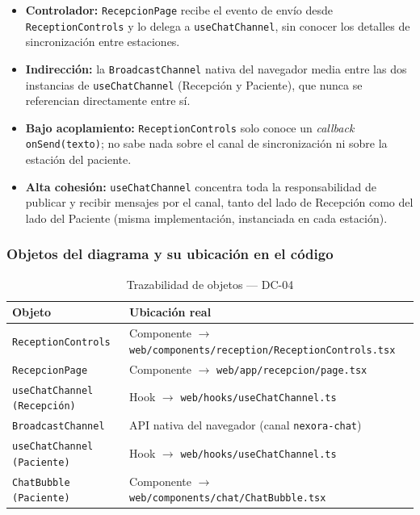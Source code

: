 \begin{itemize}[leftmargin=*, itemsep=2pt]
    \item \textbf{Controlador:} \texttt{RecepcionPage} recibe el evento de
    envío desde \texttt{ReceptionControls} y lo delega a
    \texttt{useChatChannel}, sin conocer los detalles de sincronización
    entre estaciones.
    \item \textbf{Indirección:} la \texttt{BroadcastChannel} nativa del
    navegador media entre las dos instancias de \texttt{useChatChannel}
    (Recepción y Paciente), que nunca se referencian directamente entre sí.
    \item \textbf{Bajo acoplamiento:} \texttt{ReceptionControls} solo conoce
    un \textit{callback} \texttt{onSend(texto)}; no sabe nada sobre el canal
    de sincronización ni sobre la estación del paciente.
    \item \textbf{Alta cohesión:} \texttt{useChatChannel} concentra toda la
    responsabilidad de publicar y recibir mensajes por el canal, tanto del
    lado de Recepción como del lado del Paciente (misma implementación,
    instanciada en cada estación).
\end{itemize}

\subsubsection{Objetos del diagrama y su ubicación en el código}

\begin{table}[H]
\centering
\begin{tabularx}{\textwidth}{@{}l X@{}}
\toprule
\textbf{Objeto} & \textbf{Ubicación real} \\
\midrule
\texttt{ReceptionControls} & Componente $\rightarrow$ \texttt{web/components/reception/ReceptionControls.tsx} \\
\texttt{RecepcionPage} & Componente $\rightarrow$ \texttt{web/app/recepcion/page.tsx} \\
\texttt{useChatChannel (Recepción)} & Hook $\rightarrow$ \texttt{web/hooks/useChatChannel.ts} \\
\texttt{BroadcastChannel} & API nativa del navegador (canal \texttt{nexora-chat}) \\
\texttt{useChatChannel (Paciente)} & Hook $\rightarrow$ \texttt{web/hooks/useChatChannel.ts} \\
\texttt{ChatBubble (Paciente)} & Componente $\rightarrow$ \texttt{web/components/chat/ChatBubble.tsx} \\
\bottomrule
\end{tabularx}
\caption{Trazabilidad de objetos --- DC-04}
\label{tab:col-objetos-dc04}
\end{table}

